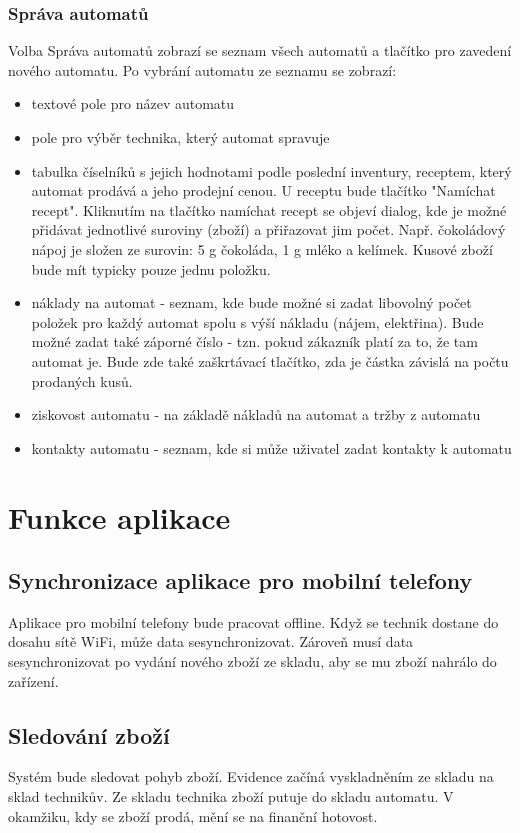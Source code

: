 \documentclass[a4paper,10pt]{article}
\begin{document}
\subsubsection*{Správa automatů}
Volba Správa automatů zobrazí se seznam všech automatů a tlačítko pro zavedení nového automatu. Po vybrání automatu ze seznamu se zobrazí:
\begin{itemize}
	\item textové pole pro název automatu
	\item pole pro výběr technika, který automat spravuje
	\item tabulka číselníků s jejich hodnotami podle poslední inventury, receptem, který automat prodává a jeho prodejní cenou. U receptu bude tlačítko "Namíchat recept".
	Kliknutím na tlačítko namíchat recept se objeví dialog, kde je možné přidávat jednotlivé suroviny (zboží) a přiřazovat jim počet. Např. čokoládový nápoj je složen ze surovin: 5 g čokoláda, 1 g mléko a kelímek. Kusové zboží bude mít typicky pouze jednu položku.
	\item náklady na automat - seznam, kde bude možné si zadat libovolný počet položek pro každý automat spolu s výší nákladu (nájem, elektřina). Bude možné zadat také záporné číslo - tzn. pokud zákazník platí za to, že tam automat je. Bude zde také zaškrtávací tlačítko, zda je částka závislá na počtu prodaných kusů.
	\item ziskovost automatu - na základě nákladů na automat a tržby z automatu
	\item kontakty automatu - seznam, kde si může uživatel zadat kontakty k automatu
\end{itemize}

\section{Funkce aplikace}
\subsection{Synchronizace aplikace pro mobilní telefony}
Aplikace pro mobilní telefony bude pracovat offline. Když se technik dostane do dosahu sítě WiFi, může data sesynchronizovat. Zároveň musí data sesynchronizovat po vydání nového zboží ze skladu, aby se mu zboží nahrálo do zařízení.
\subsection{Sledování zboží}
Systém bude sledovat pohyb zboží. Evidence začíná vyskladněním ze skladu na sklad technikův. Ze skladu technika zboží putuje do skladu automatu. V okamžiku, kdy se zboží prodá, mění se na finanční hotovost.
\end{document}
